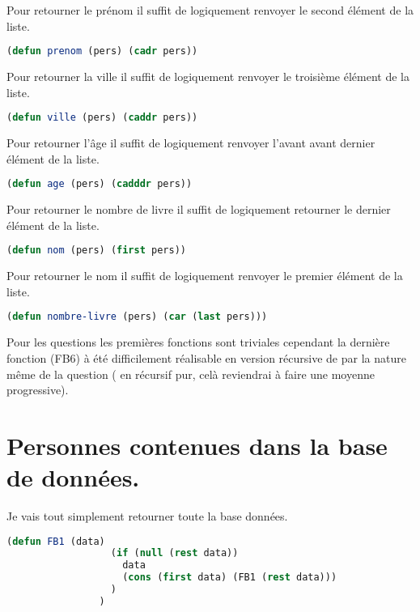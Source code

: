 \documentclass[a4paper, 12pt, leqno]{report}
\theoremstyle{plain}
\begin{document}
            Pour retourner le prénom il suffit de logiquement renvoyer le second élément de la liste.
              \begin{lstlisting}[label=some-code,caption=prenom(Personne),language=lisp]
                (defun prenom (pers) (cadr pers))
            \end{lstlisting} 
            
            Pour retourner la ville il suffit de logiquement renvoyer le troisième élément de la liste.
              \begin{lstlisting}[label=some-code,caption=ville(Personne),language=lisp]
                (defun ville (pers) (caddr pers))
            \end{lstlisting} 
            
            Pour retourner l’âge il suffit de logiquement renvoyer l'avant avant dernier élément de la liste.
              \begin{lstlisting}[label=some-code,caption=age(Personne),language=lisp]
                (defun age (pers) (cadddr pers))
            \end{lstlisting} 
            
            Pour retourner le nombre de livre il suffit de logiquement retourner le dernier élément de la liste.
              \begin{lstlisting}[label=some-code,caption=nom(Personne),language=lisp]
                (defun nom (pers) (first pers))
            \end{lstlisting} 
            
            Pour retourner le nom il suffit de logiquement renvoyer le premier élément de la liste.
              \begin{lstlisting}[label=some-code,caption=nombre-livre(Personne),language=lisp]
                (defun nombre-livre (pers) (car (last pers)))
            \end{lstlisting} 
            
            Pour les questions les premières fonctions sont triviales cependant la dernière fonction (FB6) à été difficilement réalisable en version récursive de par la nature même de la question ( en récursif pur, celà reviendrai à faire une moyenne progressive).
           \newpage
              \section{Personnes contenues dans la base de données.}
              Je vais tout simplement retourner toute la base données.
              \begin{lstlisting}[label=some-code,caption=FB1(data),language=lisp]
                (defun FB1 (data) 
                  (if (null (rest data)) 
                    data 
                    (cons (first data) (FB1 (rest data)))
                  )
                )
            \end{lstlisting}
            
\end{document}
